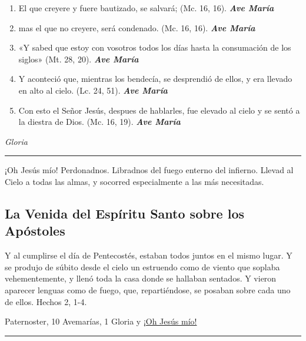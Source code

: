 \documentclass[a4paper,11pt, oneside]{report}
\begin{document}
{{\begin{enumerate}
        \item El que creyere y fuere bautizado, se salvará; (Mc. 16, 16). \textbf{\textit{Ave María}}

        \item mas el que no creyere, será condenado. (Mc. 16, 16). \textbf{\textit{Ave María}}

        \item «Y sabed que estoy con vosotros todos los días hasta la consumación de los siglos» (Mt. 28, 20). \textbf{\textit{Ave María}}

        \item Y aconteció que, mientras los bendecía, se desprendió de ellos, y era llevado en alto al cielo. (Lc. 24, 51). \textbf{\textit{Ave María}}

        \item Con esto el Señor Jesús, despues de hablarles, fue elevado al cielo y se sentó a la diestra de Dios. (Mc. 16, 19). \textbf{\textit{Ave María}}

      \end{enumerate}

      \indent\textit{Gloria} \par      

      \begin{center}\rule{1\linewidth}{\linethickness}\end{center}      

      \medskip
      \hypertarget{finalAscension}{¡Oh Jesús mío! Perdonadnos. Libradnos del fuego enterno del infierno. Llevad al Cielo a todas las almas, y socorred especialmente a las más 
      necesitadas.}
    }
    
  \subsection*{La Venida del Espíritu Santo sobre los Apóstoles}
    {
      Y al cumplirse el día de Pentecostés, estaban todos juntos en el mismo lugar. Y se produjo de súbito desde el cielo un estruendo como de viento
      que soplaba vehementemente, y llenó toda la casa donde se hallaban sentados. Y vieron aparecer lenguas como de fuego, que, repartiéndose, se 
      posaban sobre cada uno de ellos. Hechos 2, 1-4.

       Paternoster, 10 Avemarías, 1 Gloria y \hyperlink{finalPentecostes}{¡Oh Jesús mío!}

      \begin{center}\rule{1\linewidth}{\linethickness}\end{center}

}}
\end{document}
